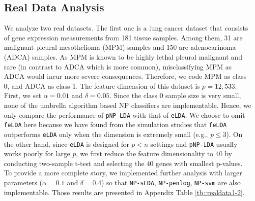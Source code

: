 \documentclass[12pt]{article}
\numberwithin{equation}{section}
\theoremstyle{remark}
\newcommand{\1}{{\rm 1}\kern-0.24em{\rm I}}
\begin{document}
\subsection{Real Data Analysis}
We analyze two real datasets.  
The first one is a lung cancer dataset \citep{gordon2002translation,jin2016influential} that consists of gene expression measurements from 181 tissue samples.  Among them, 31 are malignant pleural mesothelioma (MPM) samples and 150 are adenocarinoma (ADCA) samples.   As MPM is known to be highly lethal pleural malignant and rare (in contrast to ADCA which is more common),  misclassifying MPM as ADCA would incur more severe consequences. Therefore,  we code MPM as class 0, and ADCA as class 1.  The feature dimension of this dataset is  $p =12{,}533$.  First, we set $\alpha=0.01$ and $\delta=0.05$.  Since the class 0 sample size is very small,  none of the umbrella algorithm based NP classifiers are implementable. Hence, we only compare the performance of  \verb+pNP-LDA+ with that of  \verb+eLDA+.  We choose to omit \verb+feLDA+ here because we have found from the simulation studies that \verb+feLDA+ outperforms \verb+eLDA+ only when the dimension is extremely small (e.g., $p\leq 3$).  On the other hand,  since \verb+eLDA+ is designed for $p<n$ settings and \verb+pNP-LDA+ usually works poorly for large $p$,  we first reduce the feature dimensionality to 40 by conducting two-sample t-test and selecting the 40 genes with smallest p-values.  To provide a more complete story,  we implemented further analysis with larger parameters ($\alpha = 0.1$ and $\delta = 0.4$) so that \verb+NP-sLDA+,  \verb+NP-penlog+,  \verb+NP-svm+ are also implementable. Those results are presented in Appendix Table \ref{tb::realdata1-2}.
\end{document}

